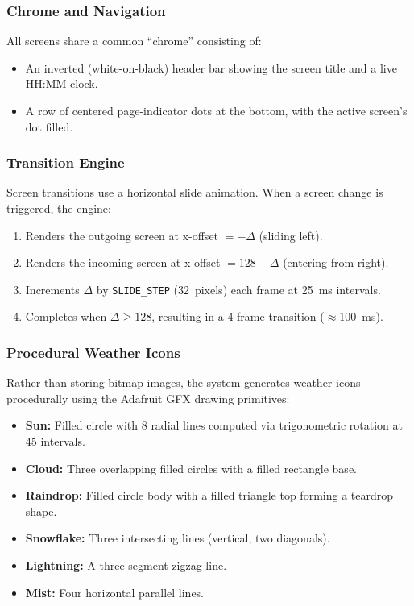 \documentclass[conference]{IEEEtran}
\begin{document}
\subsubsection{Chrome and Navigation}

All screens share a common ``chrome'' consisting of:
\begin{itemize}
    \item An inverted (white-on-black) header bar showing the screen title and a live HH:MM clock.
    \item A row of centered page-indicator dots at the bottom, with the active screen's dot filled.
\end{itemize}

\subsubsection{Transition Engine}

Screen transitions use a horizontal slide animation. When a screen change is triggered, the engine:
\begin{enumerate}
    \item Renders the outgoing screen at x-offset $= -\Delta$ (sliding left).
    \item Renders the incoming screen at x-offset $= 128 - \Delta$ (entering from right).
    \item Increments $\Delta$ by \texttt{SLIDE\_STEP} (32~pixels) each frame at 25~ms intervals.
    \item Completes when $\Delta \geq 128$, resulting in a 4-frame transition ($\approx$100~ms).
\end{enumerate}

\subsubsection{Procedural Weather Icons}

Rather than storing bitmap images, the system generates weather icons procedurally using the Adafruit GFX drawing primitives:

\begin{itemize}
    \item \textbf{Sun:} Filled circle with 8 radial lines computed via trigonometric rotation at 45\textdegree{} intervals.
    \item \textbf{Cloud:} Three overlapping filled circles with a filled rectangle base.
    \item \textbf{Raindrop:} Filled circle body with a filled triangle top forming a teardrop shape.
    \item \textbf{Snowflake:} Three intersecting lines (vertical, two diagonals).
    \item \textbf{Lightning:} A three-segment zigzag line.
    \item \textbf{Mist:} Four horizontal parallel lines.
\end{itemize}
\end{document}
